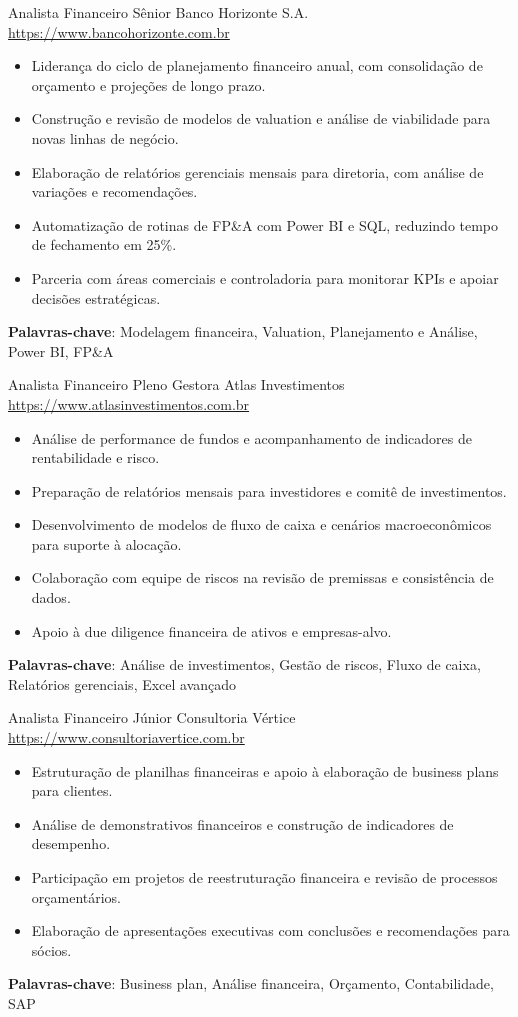 \documentclass[a4paper, serif, 10pt]{moderncv}
\begin{document}
        {Analista Financeiro Sênior}
        {Banco Horizonte S.A.}
        {\url{https://www.bancohorizonte.com.br}}
        {}
        {\begin{itemize}
\item Liderança do ciclo de planejamento financeiro anual, com consolidação de orçamento e projeções de longo prazo.
\item Construção e revisão de modelos de valuation e análise de viabilidade para novas linhas de negócio.
\item Elaboração de relatórios gerenciais mensais para diretoria, com análise de variações e recomendações.
\item Automatização de rotinas de FP\&A com Power BI e SQL, reduzindo tempo de fechamento em 25\%.
\item Parceria com áreas comerciais e controladoria para monitorar KPIs e apoiar decisões estratégicas.
\end{itemize}
\textbf{Palavras-chave}: Modelagem financeira, Valuation, Planejamento e Análise, Power BI, FP\&A}

        {Analista Financeiro Pleno}
        {Gestora Atlas Investimentos}
        {\url{https://www.atlasinvestimentos.com.br}}
        {}
        {\begin{itemize}
\item Análise de performance de fundos e acompanhamento de indicadores de rentabilidade e risco.
\item Preparação de relatórios mensais para investidores e comitê de investimentos.
\item Desenvolvimento de modelos de fluxo de caixa e cenários macroeconômicos para suporte à alocação.
\item Colaboração com equipe de riscos na revisão de premissas e consistência de dados.
\item Apoio à due diligence financeira de ativos e empresas-alvo.
\end{itemize}
\textbf{Palavras-chave}: Análise de investimentos, Gestão de riscos, Fluxo de caixa, Relatórios gerenciais, Excel avançado}

        {Analista Financeiro Júnior}
        {Consultoria Vértice}
        {\url{https://www.consultoriavertice.com.br}}
        {}
        {\begin{itemize}
\item Estruturação de planilhas financeiras e apoio à elaboração de business plans para clientes.
\item Análise de demonstrativos financeiros e construção de indicadores de desempenho.
\item Participação em projetos de reestruturação financeira e revisão de processos orçamentários.
\item Elaboração de apresentações executivas com conclusões e recomendações para sócios.
\end{itemize}
\textbf{Palavras-chave}: Business plan, Análise financeira, Orçamento, Contabilidade, SAP}
\end{document}

